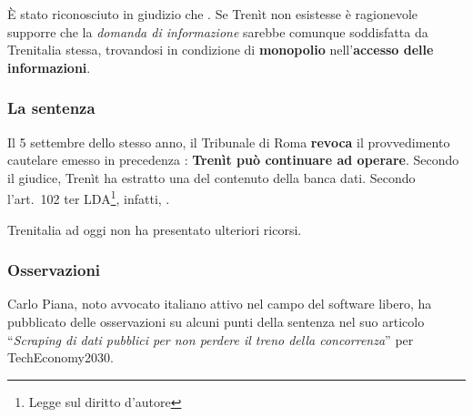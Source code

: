 \documentclass[12pt,italian]{report}
\begin{document}
È stato riconosciuto in giudizio che .  Se Trenìt non esistesse è ragionevole supporre che la
\textit{domanda di informazione} sarebbe comunque soddisfatta da
Trenitalia stessa, trovandosi in condizione di \textbf{monopolio}
nell'\textbf{accesso delle informazioni}.

\subsubsection{La sentenza}

Il 5 settembre dello stesso anno, il Tribunale di Roma \textbf{revoca}
il provvedimento cautelare emesso in precedenza \cite{TrenitSentenza}:
\textbf{Trenìt può continuare ad operare}.  Secondo il giudice, Trenìt
ha estratto una  del
contenuto della banca dati.  Secondo l'art.\ 102 ter
LDA\footnote{Legge sul diritto d'autore}, infatti,
.

Trenitalia ad oggi non ha presentato ulteriori ricorsi.

\subsubsection{Osservazioni}

Carlo Piana, noto avvocato italiano attivo nel campo del software
libero, ha pubblicato delle osservazioni su alcuni punti della
sentenza nel suo articolo ``\textit{Scraping di dati pubblici per non
    perdere il treno della concorrenza}'' \cite{TrenitPiana} per
TechEconomy2030.
\end{document}

